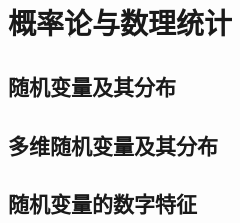 \part{概率论与数理统计}
\begingroup
\def\x{\chi^2}%
\def\dotsim{\overset{.}{\sim}}%


\chapter{随机变量及其分布}





\chapter{多维随机变量及其分布}








\chapter{随机变量的数字特征}







\endgroup
